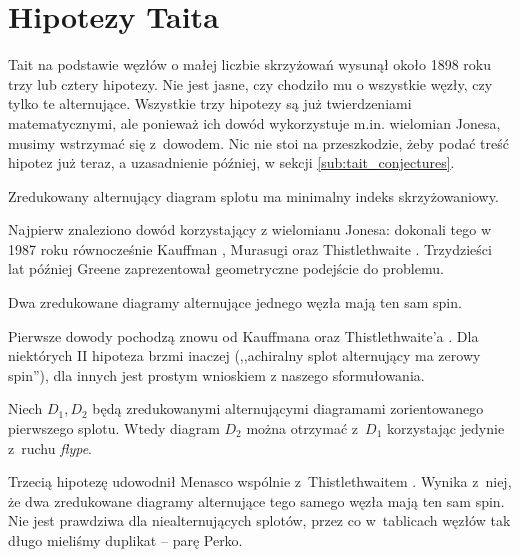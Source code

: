 
\section{Hipotezy Taita}
%

Tait na podstawie węzłów o małej liczbie skrzyżowań  wysunął około 1898 roku trzy lub cztery hipotezy.
Nie jest jasne, czy chodziło mu o wszystkie węzły, czy tylko te alternujące.
Wszystkie trzy hipotezy są już twierdzeniami matematycznymi, ale ponieważ ich dowód wykorzystuje m.in. wielomian Jonesa, musimy wstrzymać się z~dowodem.
Nic nie stoi na przeszkodzie, żeby podać treść hipotez już teraz, a uzasadnienie później, w sekcji \ref{sub:tait_conjectures}.

\begin{conjecture}
%
\label{con:tait_1}%
    Zredukowany alternujący diagram splotu ma minimalny indeks skrzyżowaniowy.
\end{conjecture}

Najpierw znaleziono dowód korzystający z wielomianu Jonesa: dokonali tego w 1987 roku równocześnie Kauffman \cite{kauffman1987}, Murasugi \cite{murasugi1987} oraz Thistlethwaite \cite{thistlethwaite1987}.
%
%
%
Trzydzieści lat później Greene \cite{greene2017} zaprezentował geometryczne podejście do problemu.
%

\begin{conjecture}
%
    Dwa zredukowane diagramy alternujące jednego węzła mają ten sam spin.
\end{conjecture}

Pierwsze dowody pochodzą znowu od Kauffmana \cite{kauffman1987} oraz Thistlethwaite'a \cite{thistlethwaite1987}.
%
%
Dla niektórych II hipoteza brzmi inaczej (,,achiralny splot alternujący ma zerowy spin''), dla innych jest prostym wnioskiem z naszego sformułowania.

\begin{conjecture}
%
    Niech $D_1, D_2$ będą zredukowanymi alternującymi diagramami zorientowanego pierwszego splotu.
    Wtedy diagram $D_2$ można otrzymać z~$D_1$ korzystając jedynie z~ruchu \emph{flype}.
\end{conjecture}

Trzecią hipotezę udowodnił Menasco wspólnie z~Thistlethwaitem \cite{menasco1993}.
%
%
Wynika z~niej, że dwa zredukowane diagramy alternujące tego samego węzła mają ten sam spin.
Nie jest prawdziwa dla niealternujących splotów, przez co w~tablicach węzłów tak długo mieliśmy duplikat -- parę Perko.
%

